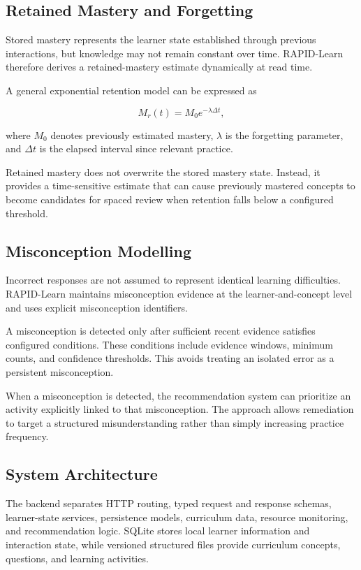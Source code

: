 \documentclass[conference]{IEEEtran}
\begin{document}
\subsection{Retained Mastery and Forgetting}

Stored mastery represents the learner state established through previous interactions, but knowledge may not remain constant over time. RAPID-Learn therefore derives a retained-mastery estimate dynamically at read time.

A general exponential retention model can be expressed as

\begin{equation}
M_r(t)=M_0 e^{-\lambda \Delta t},
\end{equation}

where $M_0$ denotes previously estimated mastery, $\lambda$ is the forgetting parameter, and $\Delta t$ is the elapsed interval since relevant practice.

Retained mastery does not overwrite the stored mastery state. Instead, it provides a time-sensitive estimate that can cause previously mastered concepts to become candidates for spaced review when retention falls below a configured threshold.

\subsection{Misconception Modelling}

Incorrect responses are not assumed to represent identical learning difficulties. RAPID-Learn maintains misconception evidence at the learner-and-concept level and uses explicit misconception identifiers.

A misconception is detected only after sufficient recent evidence satisfies configured conditions. These conditions include evidence windows, minimum counts, and confidence thresholds. This avoids treating an isolated error as a persistent misconception.

When a misconception is detected, the recommendation system can prioritize an activity explicitly linked to that misconception. The approach allows remediation to target a structured misunderstanding rather than simply increasing practice frequency.

\subsection{System Architecture}

The backend separates HTTP routing, typed request and response schemas, learner-state services, persistence models, curriculum data, resource monitoring, and recommendation logic. SQLite stores local learner information and interaction state, while versioned structured files provide curriculum concepts, questions, and learning activities.
\end{document}
